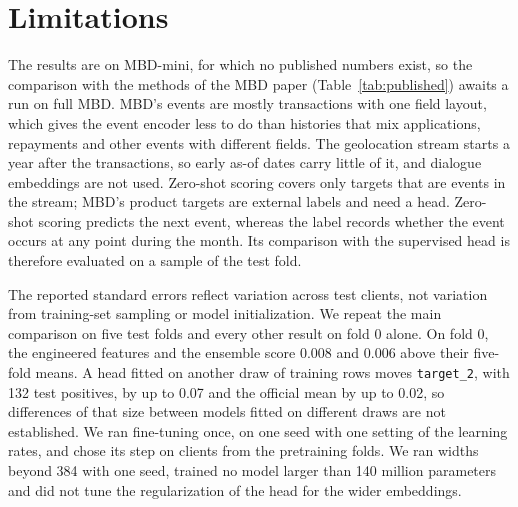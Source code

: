 \documentclass[12pt]{article}
\newcommand{\tok}[1]{\texttt{#1}}
\begin{document}
\section{Limitations}\label{sec:limits}

The results are on MBD-mini, for which no published numbers exist, so the comparison with the methods of the MBD paper (Table~\ref{tab:published}) awaits a run on full MBD. MBD's events are mostly transactions with one field layout, which gives the event encoder less to do than histories that mix applications, repayments and other events with different fields. The geolocation stream starts a year after the transactions, so early as-of dates carry little of it, and dialogue embeddings are not used. Zero-shot scoring covers only targets that are events in the stream; MBD's product targets are external labels and need a head. Zero-shot scoring predicts the next event, whereas the label records whether the event occurs at any point during the month. Its comparison with the supervised head is therefore evaluated on a sample of the test fold.

The reported standard errors reflect variation across test clients, not variation from training-set sampling or model initialization. We repeat the main comparison on five test folds and every other result on fold 0 alone. On fold 0, the engineered features and the ensemble score 0.008 and 0.006 above their five-fold means. A head fitted on another draw of training rows moves \tok{target\_2}, with 132 test positives, by up to 0.07 and the official mean by up to 0.02, so differences of that size between models fitted on different draws are not established. We ran fine-tuning once, on one seed with one setting of the learning rates, and chose its step on clients from the pretraining folds. We ran widths beyond 384 with one seed, trained no model larger than 140 million parameters and did not tune the regularization of the head for the wider embeddings.
\end{document}
